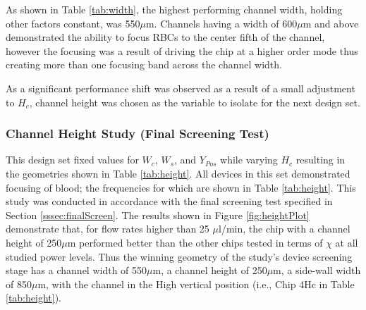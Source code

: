 As shown in Table \ref{tab:width}, the highest performing channel width, holding other factors constant, was 550$\mu$m. Channels having a width of 600$\mu$m and above demonstrated the ability to focus RBCs to the center fifth of the channel, however the focusing was a result of driving the chip at a higher order mode thus creating more than one focusing band across the channel width. 

As a significant performance shift was observed as a result of a small adjustment to $H_c$, channel height was chosen as the variable to isolate for the next design set. 

\subsubsection{Channel Height Study (Final Screening Test)}
\label{sssec:height}

This design set fixed values for $W_c$, $W_s$, and $Y_{Pos}$ while varying $H_c$ resulting in the geometries shown in Table \ref{tab:height}. All devices in this set demonstrated focusing of blood; the frequencies for which are shown in Table \ref{tab:height}. This study was conducted in accordance with the final screening test specified in Section \ref{sssec:finalScreen}. The results shown in Figure \ref{fig:heightPlot} demonstrate that, for flow rates higher than 25 $\mu$l/min, the chip with a channel height of 250$\mu$m performed better than the other chips tested in terms of $\chi$ at all studied power levels. Thus the winning geometry of the study's device screening stage has a channel width of 550$\mu$m, a channel height of 250$\mu$m, a side-wall width of 850$\mu$m, with the channel in the High vertical position (i.e., Chip 4Hc in Table \ref{tab:height}).

